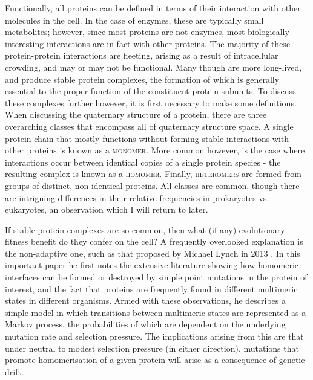 \documentclass[a4paper,11pt,twoside,openright]{scrbook}
\begin{document}
Functionally, all proteins can be defined in terms of their interaction with other molecules in the cell. In the case of enzymes, these are typically small metabolites; however, since most proteins are not enzymes, most biologically interesting interactions are in fact with other proteins. The majority of these protein-protein interactions are fleeting, arising as a result of intracellular crowding, and may or may not be functional. Many though are more long-lived, and produce stable protein complexes, the formation of which is generally essential to the proper function of the constituent protein subunits. To discuss these complexes further however, it is first necessary to make some definitions. When discussing the quaternary structure of a protein, there are three overarching classes that encompass all of quaternary structure space. A single protein chain that mostly functions without forming stable interactions with other proteins is known as a \textsc{monomer}. More common however, is the case where interactions occur between identical copies of a single protein species - the resulting complex is known as a \textsc{homomer}. Finally, \textsc{heteromers} are formed from groups of distinct, non-identical proteins. All classes are common, though there are intriguing differences in their relative frequencies in prokaryotes vs. eukaryotes, an observation which I will return to later.

If stable protein complexes are so common, then what (if any) evolutionary fitness benefit do they confer on the cell? A frequently overlooked explanation is the non-adaptive one, such as that proposed by Michael Lynch in 2013 \cite{Lynch2013}. In this important paper he first notes the extensive literature showing how homomeric interfaces can be formed or destroyed by simple point mutations in the protein of interest, and the fact that proteins are frequently found in different multimeric states in different organisms. Armed with these observations, he describes a simple model in which transitions between multimeric states are represented as a Markov process, the probabilities of which are dependent on the underlying mutation rate and selection pressure. The implications arising from this are that under neutral to modest selection pressure (in either direction), mutations that promote homomerisation of a given protein will arise as a consequence of genetic drift.
\end{document}
